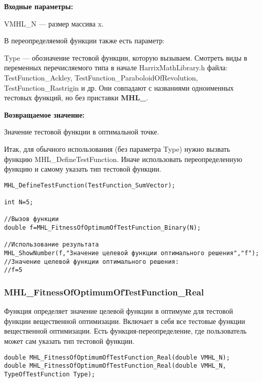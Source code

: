 \documentclass[a4paper,12pt]{article}
\begin{document}
\textbf{Входные параметры:}

VMHL\_N --- размер массива x.

В переопределяемой функции также есть параметр:
  
Type --- обозначение тестовой функции, которую вызываем.
Смотреть виды в переменных перечисляемого типа в начале HarrixMathLibrary.h файла: TestFunction\_Ackley, TestFunction\_ParaboloidOfRevolution, TestFunction\_Rastrigin и др. Они совпадают с названиями одноименных тестовых функций, но без приставки \textbf{MHL\_}.

\textbf{Возвращаемое значение:}
 
Значение тестовой функции в оптимальной точке.

Итак, для обычного использования (без параметра Type) нужно вызвать функцию MHL\_DefineTestFunction. Иначе использовать переопределенную функцию и самому указать тип тестовой функции.


\begin{lstlisting}[label=code_use_MHL_FitnessOfOptimumOfTestFunction_Binary,caption=Пример использования]
MHL_DefineTestFunction(TestFunction_SumVector);

int N=5;

//Вызов функции
double f=MHL_FitnessOfOptimumOfTestFunction_Binary(N);

//Использование результата
MHL_ShowNumber(f,"Значение целевой функции оптимального решения","f");
//Значение целевой функции оптимального решения:
//f=5
\end{lstlisting}

\subsubsection{MHL\_FitnessOfOptimumOfTestFunction\_Real}\label{MHL_FitnessOfOptimumOfTestFunction_Real}

Функция определяет значение целевой функции в оптимуме для тестовой функции вещественной оптимизации. Включает в себя все тестовые функции вещественной оптимизации. Есть функция-переопределение, где пользователь может сам указать тип тестовой функции.


\begin{lstlisting}[label=code_syntax_MHL_FitnessOfOptimumOfTestFunction_Real,caption=Синтаксис]
double MHL_FitnessOfOptimumOfTestFunction_Real(double VMHL_N);
double MHL_FitnessOfOptimumOfTestFunction_Real(double VMHL_N, TypeOfTestFunction Type);
\end{lstlisting}
\end{document}
